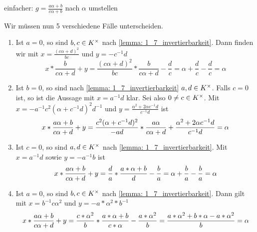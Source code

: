 \begin{exercisePage}
\begin{itemize}[leftmargin=*]
        \begin{correction}
        	einfacher: $g = \frac{a \alpha + b}{c \alpha + b}$ nach $\alpha$ umstellen
        \end{correction}
        
        Wir müssen nun 5 verschiedene Fälle unterscheiden.        \begin{enumerate}[leftmargin=*, label=(\roman*)]
            \item Ist $a = 0$, so sind $b,c \in {K}^{\times}$ nach \cref{lemma: 1_7_invertierbarkeit}. Dann finden wir mit $x = \frac{(c \alpha + d)^2}{bc}$ und $y = -c^{-1}d$
            \begin{equation*}
                x * \frac{b}{c \alpha + d} + y = \frac{(c \alpha + d)^2}{bc} * \frac{b}{c \alpha + d} - \frac{d}{c}
                = \alpha + \frac{d}{c} - \frac{d}{c} = \alpha
            \end{equation*}
            \item Ist $b = 0$, so sind nach \cref{lemma: 1_7_invertierbarkeit} $a,d \in {K}^{\times}$. Falls $c = 0$ ist, so ist die Aussage mit $x = a^{-1}d$ klar. Sei also $0 \neq c \in {K}^{\times}$. Mit $x = -a^{-1} c^2 (\alpha + c^{-1}d)^2 d^{-1}$ und $y = \frac{\alpha^2 + 2 \alpha c^{-1} d}{c^{-1} d}$ ist 
            \begin{equation*}
                x * \frac{a \alpha + b}{c \alpha + d} + y 
                = \frac{c^2 (\alpha + c^{-1}d)^2}{-ad} * \frac{a \alpha}{c\alpha + d} + \frac{\alpha^2 + 2\alpha c^{-1} d}{c^{-1} d} = \alpha
            \end{equation*}
            \item Ist $c = 0$, so sind $a,d \in {K}^{\times}$ nach \cref{lemma: 1_7_invertierbarkeit}. Mit $x = a^{-1} d$ sowie $y = -a^{-1} b  $ ist
            \begin{equation*}
            x * \frac{a \alpha + b}{c \alpha + d} + y = \frac{d}{a} * \frac{a * \alpha + b}{d} - \frac{b}{a} = \alpha + \frac{b}{a} - \frac{b}{a} = \alpha
            \end{equation*}
            \item Ist $a = 0$, so sind $b,c \in {K}^{\times}$ nach \cref{lemma: 1_7_invertierbarkeit}. Dann gilt mit $x = b^{-1} c \alpha^2$ und $y = -a*\alpha^2*b^{-1}$
            \begin{equation*}
                x * \frac{a \alpha + b}{c \alpha + d} + y 
                = \frac{c * \alpha^2}{b} * \frac{a*\alpha + b}{c * \alpha} - \frac{a*\alpha^2}{b} 
                = \frac{a*\alpha^2 + b * \alpha - a*\alpha^2}{b} 
                = \alpha
            \end{equation*}

\end{enumerate}
\end{itemize}
\end{exercisePage}
